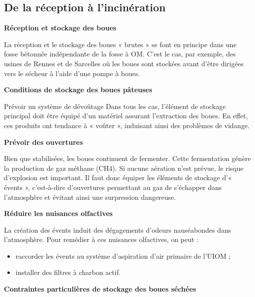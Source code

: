  
\subsection{De la réception à l'incinération}

\textbf{Réception et stockage des boues}
\vspace{0.3cm}

La réception et le stockage des boues « brutes » se font en principe dans une fosse bétonnée indépendante de la fosse à OM. C’est le cas, par exemple, des usines de Rennes et de Sarcelles où les boues sont stockées avant d’être dirigées vers le sécheur à l’aide d’une pompe à boues. 

\vspace{0.3cm}
\textbf{Conditions de stockage des boues pâteuses}
\vspace{0.3cm}

Prévoir un système de dévoûtage
Dans tous les cas, l’élément de stockage principal doit être équipé d’un matériel assurant l’extraction des boues. En effet, ces produits ont tendance à « voûter », induisant ainsi des problèmes de vidange.

\vspace{0.3cm}
\textbf{Prévoir des ouvertures}
\vspace{0.3cm}

Bien que stabilisées, les boues continuent de fermenter. Cette fermentation génère la production de gaz méthane (CH4). Si aucune aération n’est prévue, le risque d’explosion est 
important. Il faut donc équiper les éléments de stockage d’« évents », c’est-à-dire d’ouvertures permettant au gaz de s’échapper dans l’atmosphère et évitant ainsi une surpression dangereuse.


\vspace{0.3cm}
\textbf{Réduire les nuisances olfactives}
\vspace{0.3cm}

La création des évents induit des dégagements d’odeurs nauséabondes dans l’atmosphère. Pour remédier à ces nuisances olfactives, on peut :
\begin{itemize}
\item raccorder les évents au système d’aspiration d’air primaire de l’UIOM ;
\item installer des filtres à charbon actif.
\end{itemize}

\vspace{0.3cm}
\textbf{Contraintes particulières de stockage des boues séchées}
\vspace{0.3cm}

